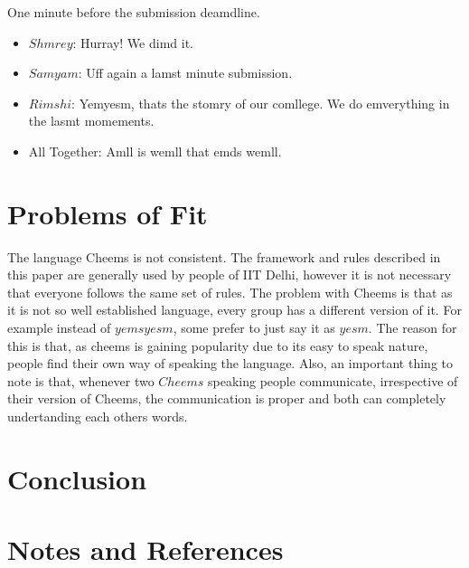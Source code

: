\documentclass{article}
\begin{document}
One minute before the submission deamdline.
\begin{itemize}[label={}]
    \item $Shmrey$: Hurray! We dimd it.
    \item $Samyam$: Uff again a lamst minute submission.
    \item $Rimshi$: Yemyesm, thats the stomry of our comllege. We do emverything in the lasmt momements.
    \item All Together: Amll is wemll that emds wemll.
\end{itemize}


\section{Problems of Fit}
The language Cheems is not consistent. The framework and rules described in this paper are generally used by people of IIT Delhi, however it is not necessary that everyone follows the same set of rules. The problem with Cheems is that as it is not so well established language, every group has a different version of it. For example instead of $yemsyesm$, some prefer to just say it as $yesm$. The reason for this is that, as cheems is gaining popularity due to its easy to speak nature, people find their own way of speaking the language. Also, an important thing to note is that, whenever two $Cheems$ speaking people communicate, irrespective of their version of Cheems, the communication is proper and both can completely undertanding each others words.

\section{Conclusion}

\section{Notes and References}
\end{document}
